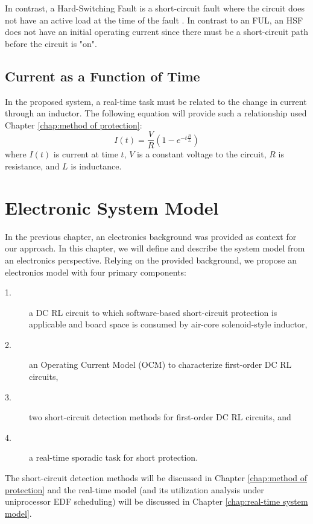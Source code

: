 \documentclass[11pt,oneside]{report}
\begin{document}
    In contrast, a Hard-Switching Fault is a short-circuit fault where the circuit does not have an active load at the time of the fault \cite{hiSpeedProtection}. In contrast to an FUL, an HSF does not have an initial operating current since there must be a short-circuit path before the circuit is "on".
    
    \section{Current as a Function of Time}
    In the proposed system, a real-time task must be related to the change in current through an inductor. The following equation will provide such a relationship used Chapter \ref{chap:method of protection}:
    \begin{equation}\label{eq:CurrentAtTime}
    I(t) = \frac{V}{R}(1-e^{-t \frac{R}{L}})
    \end{equation}
    where $I(t)$ is current at time $t$, $V$ is a constant voltage to the circuit, $R$ is resistance, and $L$ is inductance.
    \chapter{Electronic System Model}\label{chap:electronic system model}
    In the previous chapter, an electronics background was provided as context for our approach. In this chapter, we will define and describe the system model from an electronics perspective. Relying on the provided background, we propose an electronics model with four primary components:
    \begin{description}
    \item [1.] a DC RL circuit to which software-based short-circuit protection is applicable and board space is consumed by air-core solenoid-style inductor,
    \item [2.] an Operating Current Model (OCM) to characterize first-order DC RL circuits,
    \item [3.] two short-circuit detection methods for first-order DC RL circuits, and
    \item [4.] a real-time sporadic task for short protection.
    \end{description}
    
    The short-circuit detection methods will be discussed in Chapter \ref{chap:method of protection} and the real-time model (and its utilization analysis under uniprocessor EDF scheduling) will be discussed in Chapter \ref{chap:real-time system model}.
    
\end{document}
